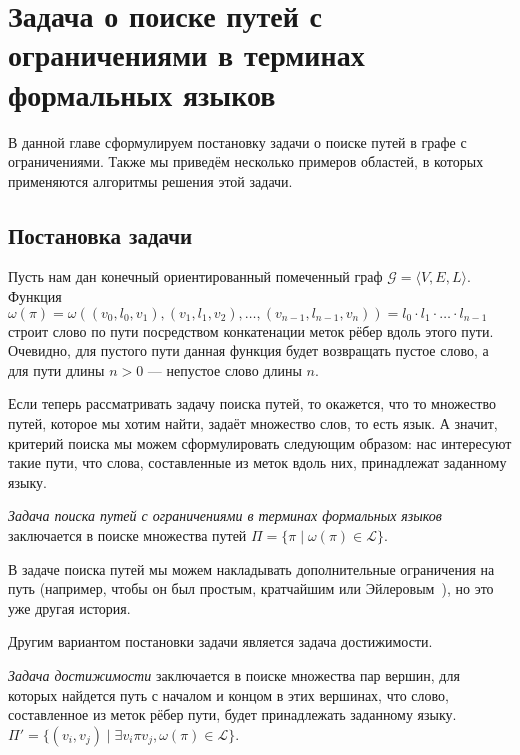\chapter{Задача о поиске путей с ограничениями в терминах формальных языков}\label{chpt:FLPQ}



В данной главе сформулируем постановку задачи о поиске путей в графе с ограничениями.
Также мы приведём несколько примеров областей, в которых применяются алгоритмы решения этой задачи.

\section{Постановка задачи }


Пусть нам дан конечный ориентированный помеченный граф $\mathcal{G}=\langle V,E,L \rangle$.
Функция $\omega(\pi) = \omega((v_0, l_0, v_1),(v_1,l_1,v_2),\dots,(v_{n-1},l_{n-1},v_n)) = l_0 \cdot l_1 \cdot \ldots \cdot l_{n-1} $ строит слово по пути посредством конкатенации меток рёбер вдоль этого пути.
Очевидно, для пустого пути данная функция будет возвращать пустое слово, а для пути длины $n  > 0$ --- непустое слово длины $n$.

Если теперь рассматривать задачу поиска путей, то окажется, что то множество путей, которое мы хотим найти, задаёт множество слов, то есть язык.
А значит, критерий поиска мы можем сформулировать следующим образом: нас интересуют такие пути, что слова, составленные из меток вдоль них, принадлежат заданному языку.
\begin{definition} \label{def1}
    \textit{Задача поиска путей с ограничениями в терминах формальных языков} заключается в поиске множества путей $\Pi = \{\pi \mid \omega(\pi) \in \mathcal{L}\}$.

\end{definition}

В задаче поиска путей мы можем накладывать дополнительные ограничения на путь (например, чтобы он был простым, кратчайшим или Эйлеровым~\cite{kupferman2016eulerian}), но это уже другая история.

Другим вариантом постановки задачи является задача достижимости.

\begin{definition} \label{def2}
    \textit{Задача достижимости} заключается в поиске множества пар вершин, для которых найдется путь с началом и концом в этих вершинах, что слово, составленное из меток рёбер пути, будет принадлежать заданному языку.
    $\Pi' = \{(v_{i}, v_{j}) \mid \exists v_{i} \pi v_{j}, \omega(\pi) \in \mathcal{L}\}$.

\end{definition}

